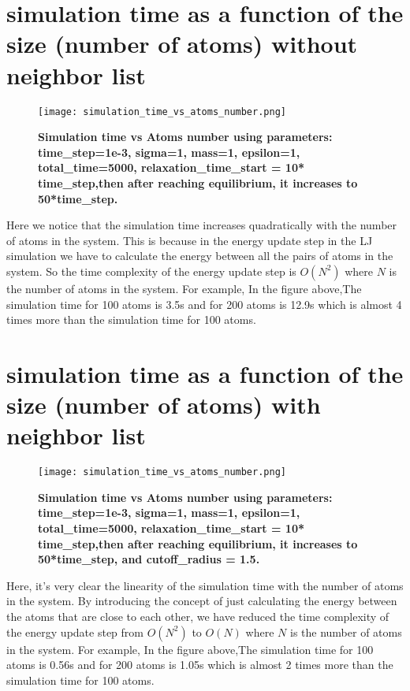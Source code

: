 \section{simulation time as a function of the size (number of atoms) without neighbor list}
    \graphicspath{ {./figures/milestone05/} }
    \begin{figure}[!htb]
    \centering
        \texttt{[image: simulation\_time\_vs\_atoms\_number.png]}
        \caption[Simulation time vs Atoms number]{\textbf{Simulation time vs Atoms number using parameters: time\_step=1e-3, sigma=1, mass=1, epsilon=1, total\_time=5000, relaxation\_time\_start = 10* time\_step,then after reaching equilibrium, it increases to 50*time\_step.}}
    \label{fig:simulation_time_vs_atoms_number}
    \end{figure}
    Here we notice that the simulation time increases quadratically with the number of atoms in the system. This is because in the energy update step in the LJ simulation we have to calculate the energy between all the pairs of atoms in the system. So the time complexity of the energy update step is $O(N^2)$ where $N$ is the number of atoms in the system. For example, In the figure above,The  simulation time for 100 atoms is 3.5s and for 200 atoms is 12.9s which is almost 4 times more than the simulation time for 100 atoms.

\section{simulation time as a function of the size (number of atoms) with neighbor list}
    \graphicspath{ {./figures/milestone06/} }
    \begin{figure}[!htb]
    \centering
        \texttt{[image: simulation\_time\_vs\_atoms\_number.png]}
        \caption[Simulation time vs Atoms number]{\textbf{Simulation time vs Atoms number using parameters: time\_step=1e-3, sigma=1, mass=1, epsilon=1, total\_time=5000, relaxation\_time\_start = 10* time\_step,then after reaching equilibrium, it increases to 50*time\_step, and cutoff\_radius = 1.5.}}
    \label{fig:simulation_time_vs_atoms_number}
    \end{figure}
    Here, it's very clear the linearity of the simulation time with the number of atoms in the system. By introducing the concept of just calculating the energy between the atoms that are close to each other, we have reduced the time complexity of the energy update step from $O(N^2)$ to $O(N)$ where $N$ is the number of atoms in the system. For example, In the figure above,The  simulation time for 100 atoms is 0.56s and for 200 atoms is 1.05s which is almost 2 times more than the simulation time for 100 atoms.


